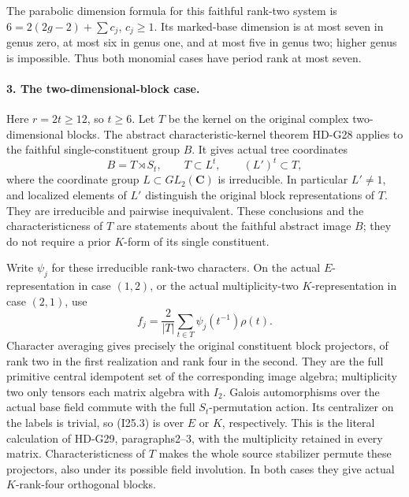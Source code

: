 The parabolic dimension formula for this faithful rank-two
system is \(6=2(2g-2)+\sum c_j\), \(c_j\ge1\).
Its marked-base dimension is at most seven in genus zero,
at most six in genus one, and at most five in genus two;
higher genus is impossible. Thus both monomial cases have
period rank at most seven.

\paragraph{3. The two-dimensional-block case.}
Here \(r=2t\ge12\), so \(t\ge6\). Let \(T\) be the
kernel on the original complex two-dimensional blocks.
The abstract characteristic-kernel theorem HD-G28 applies to
the faithful single-constituent group \(B\). It gives actual
tree coordinates
\[
 B=T\rtimes S_t,\qquad T\subset L^t,\qquad (L')^t\subset T,
                                                               \tag{I25.2}
\]
where the coordinate group \(L\subset GL_2(\mathbf C)\)
is irreducible. In particular \(L'\ne1\), and localized
elements of \(L'\) distinguish the original block
representations of \(T\). They are irreducible and pairwise
inequivalent. These conclusions and the characteristicness
of \(T\) are statements about the faithful abstract image
\(B\); they do not require a prior \(K\)-form of its single
constituent.

Write \(\psi_j\) for these irreducible rank-two characters.
On the actual \(E\)-representation in case \((1,2)\), or
the actual multiplicity-two \(K\)-representation in case
\((2,1)\), use
\[
                   f_j=\frac2{|T|}\sum_{t\in T}
                                       \psi_j(t^{-1})\rho(t).
                                                               \tag{I25.3}
\]
Character averaging gives precisely the original constituent
block projectors, of rank two in the first realization and
rank four in the second. They are the full primitive central
idempotent set of the corresponding image algebra; multiplicity
two only tensors each matrix algebra with \(I_2\).
Galois automorphisms over the actual base field commute with
the full \(S_t\)-permutation action. Its centralizer on
the labels is trivial, so (I25.3) is over \(E\) or \(K\),
respectively. This is the literal calculation of HD-G29,
paragraphs2--3, with the multiplicity retained in every matrix.
Characteristicness of \(T\) makes the whole source stabilizer
permute these projectors, also under its possible field
involution. In both cases they give actual \(K\)-rank-four
orthogonal blocks.

